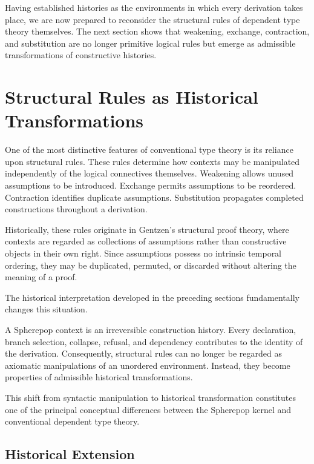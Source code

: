 \documentclass[12pt,oneside]{article}
\theoremstyle{definition}
\theoremstyle{remark}
\begin{document}
Having established histories as the environments in which every derivation
takes place, we are now prepared to reconsider the structural rules of dependent
type theory themselves. The next section shows that weakening, exchange,
contraction, and substitution are no longer primitive logical rules but emerge
as admissible transformations of constructive histories.

\section{Structural Rules as Historical Transformations}

One of the most distinctive features of conventional type theory is its reliance
upon structural rules. These rules determine how contexts may be manipulated
independently of the logical connectives themselves. Weakening allows unused
assumptions to be introduced. Exchange permits assumptions to be reordered.
Contraction identifies duplicate assumptions. Substitution propagates completed
constructions throughout a derivation.

Historically, these rules originate in Gentzen's structural proof theory, where
contexts are regarded as collections of assumptions rather than constructive
objects in their own right. Since assumptions possess no intrinsic temporal
ordering, they may be duplicated, permuted, or discarded without altering the
meaning of a proof.

The historical interpretation developed in the preceding sections fundamentally
changes this situation.

A Spherepop context is an irreversible construction history. Every declaration,
branch selection, collapse, refusal, and dependency contributes to the identity
of the derivation. Consequently, structural rules can no longer be regarded as
axiomatic manipulations of an unordered environment. Instead, they become
properties of admissible historical transformations.

This shift from syntactic manipulation to historical transformation constitutes
one of the principal conceptual differences between the Spherepop kernel and
conventional dependent type theory.

\subsection{Historical Extension}
\end{document}
